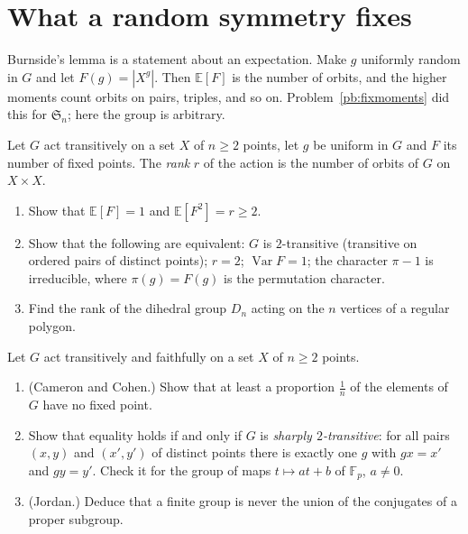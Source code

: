 \section{What a random symmetry fixes}

Burnside's lemma is a statement about an expectation. Make $g$ uniformly random in $G$ and let $F(g)=|X^g|$. Then
$\mathbb E[F]$ is the number of orbits, and the higher moments count orbits on pairs, triples, and so on. Problem~\ref{pb:fixmoments}
did this for $\mathfrak S_n$; here the group is arbitrary.

\begin{exercise}[$\star\star$]\label{pb:rank}
Let $G$ act transitively on a set $X$ of $n\ge2$ points, let $g$ be uniform in $G$ and $F$ its number of fixed points. The
\emph{rank} $r$ of the action is the number of orbits of $G$ on $X\times X$.
\begin{enumerate}[label=(\alph*)]
\item Show that $\mathbb E[F]=1$ and $\mathbb E[F^2]=r\ge2$.
\item Show that the following are equivalent: $G$ is $2$-transitive (transitive on ordered pairs of distinct points);
$r=2$; $\operatorname{Var}F=1$; the character $\pi-1$ is irreducible, where $\pi(g)=F(g)$ is the permutation character.
\item Find the rank of the dihedral group $D_n$ acting on the $n$ vertices of a regular polygon.
\end{enumerate}
\end{exercise}

\begin{exercise}[$\star\star$]\label{pb:derangements}
Let $G$ act transitively and faithfully on a set $X$ of $n\ge2$ points.
\begin{enumerate}[label=(\alph*)]
\item (Cameron and Cohen.) Show that at least a proportion $\frac1n$ of the elements of $G$ have no fixed point.
\item Show that equality holds if and only if $G$ is \emph{sharply $2$-transitive}: for all pairs $(x,y)$ and $(x',y')$ of
distinct points there is exactly one $g$ with $gx=x'$ and $gy=y'$. Check it for the group of maps $t\mapsto at+b$ of
$\mathbb F_p$, $a\ne0$.
\item (Jordan.) Deduce that a finite group is never the union of the conjugates of a proper subgroup.
\end{enumerate}
\end{exercise}

